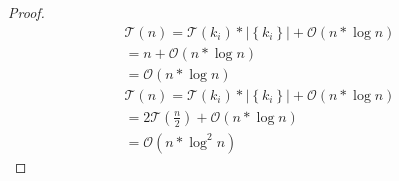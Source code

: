 \begin{proof}
  \begin{align*}
    \mathcal{T}(n)=\mathcal{T}(k_i)*\left\lvert\left\{ k_i\right\}\right\rvert +\mathcal{O}(n*\log{n}) \\
    =n+\mathcal{O}(n*\log{n}) \\
    =\mathcal{O}(n*\log{n})
  \end{align*}
  \begin{align*}
    \mathcal{T}(n)=\mathcal{T}(k_i)*\left\lvert\left\{ k_i\right\}\right\rvert +\mathcal{O}(n*\log{n}) \\
    =2\mathcal{T}(\frac{n}{2})+\mathcal{O}(n*\log{n}) \\
    =\mathcal{O}(n*\log^2{n})
  \end{align*}
\end{proof}
